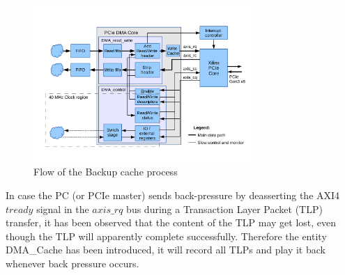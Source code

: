 \begin{figure}[H]
\centering
\includegraphics[trim=0mm 3cm 0mm 1cm, width=0.75\textwidth, page=5]{pictures/dma_core_structure.pdf}
\caption{Flow of the Backup cache process}
\label{fig:flow_dma_cache}
\end{figure}
In case the PC (or PCIe master) sends back-pressure by deasserting the AXI4 $tready$ signal in the $axis\_rq$ bus during a Transaction Layer Packet (TLP) transfer, it has been observed that the content of the TLP may get lost, even though the TLP will apparently complete successfully. Therefore the entity DMA\_Cache has been introduced, it will record all TLPs and play it back whenever back pressure occurs.

\newpage